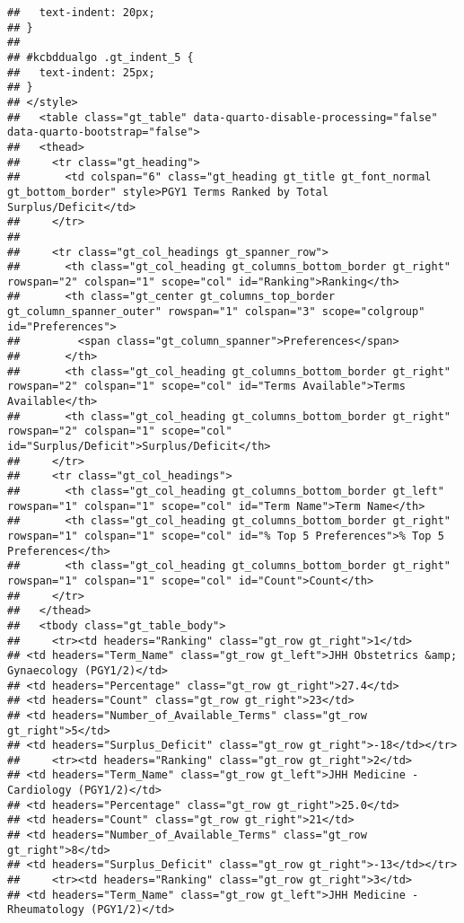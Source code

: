 \documentclass[
]{article}
\begin{document}
\begin{verbatim}
##   text-indent: 20px;
## }
## 
## #kcbddualgo .gt_indent_5 {
##   text-indent: 25px;
## }
## </style>
##   <table class="gt_table" data-quarto-disable-processing="false" data-quarto-bootstrap="false">
##   <thead>
##     <tr class="gt_heading">
##       <td colspan="6" class="gt_heading gt_title gt_font_normal gt_bottom_border" style>PGY1 Terms Ranked by Total Surplus/Deficit</td>
##     </tr>
##     
##     <tr class="gt_col_headings gt_spanner_row">
##       <th class="gt_col_heading gt_columns_bottom_border gt_right" rowspan="2" colspan="1" scope="col" id="Ranking">Ranking</th>
##       <th class="gt_center gt_columns_top_border gt_column_spanner_outer" rowspan="1" colspan="3" scope="colgroup" id="Preferences">
##         <span class="gt_column_spanner">Preferences</span>
##       </th>
##       <th class="gt_col_heading gt_columns_bottom_border gt_right" rowspan="2" colspan="1" scope="col" id="Terms Available">Terms Available</th>
##       <th class="gt_col_heading gt_columns_bottom_border gt_right" rowspan="2" colspan="1" scope="col" id="Surplus/Deficit">Surplus/Deficit</th>
##     </tr>
##     <tr class="gt_col_headings">
##       <th class="gt_col_heading gt_columns_bottom_border gt_left" rowspan="1" colspan="1" scope="col" id="Term Name">Term Name</th>
##       <th class="gt_col_heading gt_columns_bottom_border gt_right" rowspan="1" colspan="1" scope="col" id="% Top 5 Preferences">% Top 5 Preferences</th>
##       <th class="gt_col_heading gt_columns_bottom_border gt_right" rowspan="1" colspan="1" scope="col" id="Count">Count</th>
##     </tr>
##   </thead>
##   <tbody class="gt_table_body">
##     <tr><td headers="Ranking" class="gt_row gt_right">1</td>
## <td headers="Term_Name" class="gt_row gt_left">JHH Obstetrics &amp; Gynaecology (PGY1/2)</td>
## <td headers="Percentage" class="gt_row gt_right">27.4</td>
## <td headers="Count" class="gt_row gt_right">23</td>
## <td headers="Number_of_Available_Terms" class="gt_row gt_right">5</td>
## <td headers="Surplus_Deficit" class="gt_row gt_right">-18</td></tr>
##     <tr><td headers="Ranking" class="gt_row gt_right">2</td>
## <td headers="Term_Name" class="gt_row gt_left">JHH Medicine - Cardiology (PGY1/2)</td>
## <td headers="Percentage" class="gt_row gt_right">25.0</td>
## <td headers="Count" class="gt_row gt_right">21</td>
## <td headers="Number_of_Available_Terms" class="gt_row gt_right">8</td>
## <td headers="Surplus_Deficit" class="gt_row gt_right">-13</td></tr>
##     <tr><td headers="Ranking" class="gt_row gt_right">3</td>
## <td headers="Term_Name" class="gt_row gt_left">JHH Medicine - Rheumatology (PGY1/2)</td>

\end{verbatim}
\end{document}
